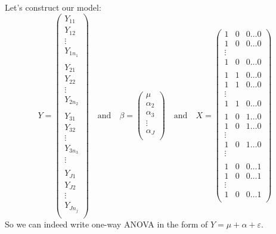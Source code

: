 \documentclass[12pt ]{article}
\begin{document}
Let's construct our model: \\
\begin{equation*}
    Y = \begin{pmatrix}
           Y_{11} \\
           Y_{12} \\
           \vdots \\
           Y_{1n_{1}} \\
           \\
           Y_{21} \\
           Y_{22} \\
           \vdots \\
           Y_{2n_{2}} \\
            \\
           Y_{31} \\
           Y_{32} \\
           \vdots \\
           Y_{3n_{3}} \\
           \vdots\\
            \\
           Y_{J1} \\
           Y_{J2} \\
           \vdots \\
           Y_{Jn_{j}} \\
         \end{pmatrix}
         \quad\text{and}\quad
      \beta = \begin{pmatrix}
      		\mu\\
		\alpha_{2} \\
		\alpha_{3} \\
		\vdots \\
		\alpha_{J} \\
	\end{pmatrix}
	\quad\text{and}\quad
	X = \begin{pmatrix}
	1 & 0 & 0 \dots 0 \\
	1 & 0 & 0 \dots 0 \\
	\vdots \\
	1 & 0 & 0 \dots 0 \\
	\\
	1 & 1 & 0 \dots 0 \\
	1 & 1 & 0 \dots 0 \\
	\vdots \\
	1 & 1 & 0 \dots 0 \\
	\\
	1 & 0 & 1 \dots 0 \\
	1 & 0 & 1 \dots 0 \\
	\vdots \\
	1 & 0 & 1 \dots 0 \\
	\vdots
	\\ \\
	1 & 0 & 0 \dots 1 \\
	1 & 0 & 0 \dots 1 \\
	\vdots \\
	1 & 0 & 0 \dots 1 \\
	\end{pmatrix}
\end{equation*}
So we can indeed write one-way ANOVA in the form of $Y = \mu + \alpha + \varepsilon$. \\
\end{document}
